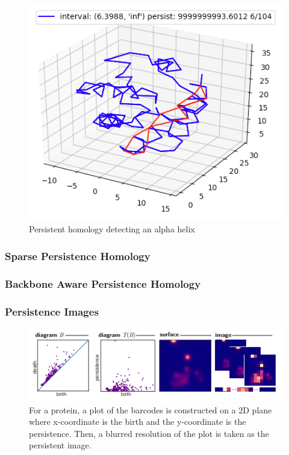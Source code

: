 \documentclass[12pt, a4paper, twocolumn, fullpage]{article}
\theoremstyle{plain}
\theoremstyle{definition}
\theoremstyle{remark}
\begin{document}
\begin{figure}
    \includegraphics[width=\linewidth]{img/hom/Simplex2.png}
    \caption{Persistent homology detecting an alpha helix}
    \label{Simplex2}
\end{figure}

\subsubsection{ Sparse Persistence Homology}

\subsubsection{ Backbone Aware Persistence Homology}

\subsubsection{ Persistence Images}

\begin{figure}
    \includegraphics[width=\linewidth]{persistenceimages.png}
    \caption{For a protein, a plot of the barcodes is constructed on a 2D plane where x-coordinate is the birth and the y-coordinate is the persistence. Then, a blurred resolution of the plot is taken as the persistent image.}
    \label{persistenceimages}
\end{figure}
\end{document}
